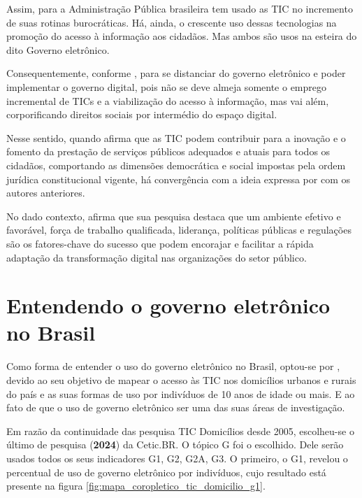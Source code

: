 Assim, para \cite{cristovam2020governo} a Administração Pública brasileira tem usado as TIC no incremento de suas rotinas burocráticas. Há, ainda, o crescente uso dessas tecnologias na promoção do acesso à informação aos cidadãos. Mas ambos são usos na esteira do dito Governo eletrônico.

Consequentemente, conforme \cite{cristovam2020governo}, para se distanciar do governo eletrônico e poder implementar o governo digital, pois não se deve almeja somente o emprego incremental de TICs e a viabilização do acesso à informação, mas vai além, corporificando direitos sociais por intermédio do espaço digital.

Nesse sentido, quando \cite{cristovam2020governo} afirma que as TIC podem contribuir para a inovação e o fomento da prestação de serviços públicos adequados e atuais para todos os cidadãos, comportando as dimensões democrática e social impostas pela ordem jurídica constitucional vigente, há convergência com a ideia expressa por \cite{kotenok2020government} com os autores anteriores.

No dado contexto, \cite{alenezi2022understanding} afirma que sua pesquisa destaca que um ambiente efetivo e favorável, força de trabalho qualificada, liderança, políticas públicas e regulações são os fatores-chave do sucesso que podem encorajar e facilitar a rápida adaptação da transformação digital nas organizações do setor público.

\section{Entendendo o governo eletrônico no Brasil}
	
Como forma de entender o uso do governo eletrônico no Brasil, optou-se por \cite{tic_domicilios_2024}, devido ao seu objetivo de mapear o acesso às TIC nos domicílios urbanos e rurais do país e as suas formas de uso por indivíduos de 10 anos de idade ou mais. E ao fato de que o uso de governo eletrônico ser uma das suas áreas de investigação.

Em razão da continuidade das pesquisa TIC Domicílios desde 2005, escolheu-se o último de pesquisa (\textbf{2024}) da Cetic.BR. O tópico G foi o escolhido. Dele serão usados todos os seus indicadores G1, G2, G2A, G3. O primeiro, o G1, revelou o percentual de uso de governo eletrônico por indivíduos, cujo resultado está presente na figura \ref{fig:mapa_coropletico_tic_domicilio_g1}.

